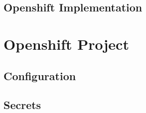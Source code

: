 \subsection{Openshift Implementation}
\label{sec:esbi-api-openshift}

\section{Openshift Project}
\label{sec:esbi-openshift}

\subsection{Configuration}
\label{sec:esbi-openshift-config}

\subsection{Secrets}
\label{sec:esbi-openshift-secrets}

